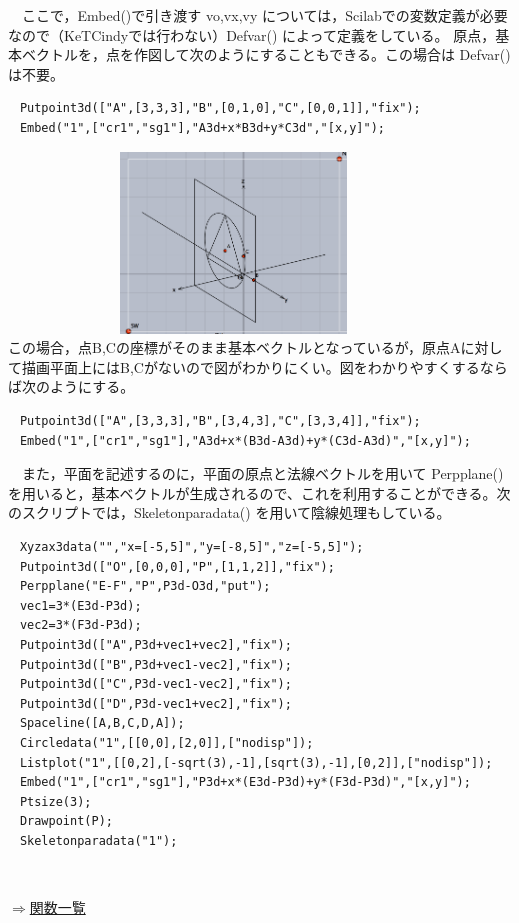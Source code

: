 \documentclass[papersize,a4paper,12pt,uplatex]{jsarticle}
\begin{document}
\begin{description}
　ここで，Embed()で引き渡す vo,vx,vy については，Scilabでの変数定義が必要なので（KeTCindyでは行わない）Defvar() によって定義をしている。
原点，基本ベクトルを，点を作図して次のようにすることもできる。この場合は Defvar() は不要。
\begin{verbatim}
　Putpoint3d(["A",[3,3,3],"B",[0,1,0],"C",[0,0,1]],"fix");
　Embed("1",["cr1","sg1"],"A3d+x*B3d+y*C3d","[x,y]");
\end{verbatim}
　　　　　　　　\includegraphics[bb=0 0 954 766 , width=6cm]{Fig3d/embed03.png}\\

この場合，点B,Cの座標がそのまま基本ベクトルとなっているが，原点Aに対して描画平面上にはB,Cがないので図がわかりにくい。図をわかりやすくするならば次のようにする。
\begin{verbatim}
　Putpoint3d(["A",[3,3,3],"B",[3,4,3],"C",[3,3,4]],"fix");
　Embed("1",["cr1","sg1"],"A3d+x*(B3d-A3d)+y*(C3d-A3d)","[x,y]");
\end{verbatim}

　また，平面を記述するのに，平面の原点と法線ベクトルを用いて Perpplane() を用いると，基本ベクトルが生成されるので、これを利用することができる。次のスクリプトでは，Skeletonparadata() を用いて陰線処理もしている。
\begin{verbatim}
　Xyzax3data("","x=[-5,5]","y=[-8,5]","z=[-5,5]");
　Putpoint3d(["O",[0,0,0],"P",[1,1,2]],"fix");
　Perpplane("E-F","P",P3d-O3d,"put");
　vec1=3*(E3d-P3d);
　vec2=3*(F3d-P3d);
　Putpoint3d(["A",P3d+vec1+vec2],"fix");
　Putpoint3d(["B",P3d+vec1-vec2],"fix");
　Putpoint3d(["C",P3d-vec1-vec2],"fix");
　Putpoint3d(["D",P3d-vec1+vec2],"fix");
　Spaceline([A,B,C,D,A]);
　Circledata("1",[[0,0],[2,0]],["nodisp"]);
　Listplot("1",[[0,2],[-sqrt(3),-1],[sqrt(3),-1],[0,2]],["nodisp"]);
　Embed("1",["cr1","sg1"],"P3d+x*(E3d-P3d)+y*(F3d-P3d)","[x,y]");
　Ptsize(3);
　Drawpoint(P);
　Skeletonparadata("1");
\end{verbatim}
 　　　　

\begin{flushright} \hyperlink{functionlist3d}{$\Rightarrow$関数一覧}\end{flushright}



\end{description}
\end{document}
